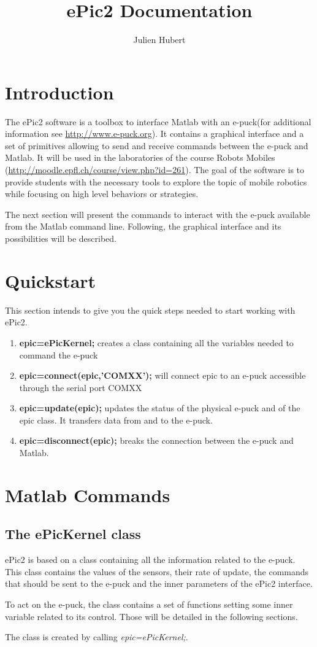 \documentclass[11pt,oneside,english,a4paper]{article}
\begin{document}
\title{ePic2 Documentation}
\author{Julien Hubert}
\maketitle
\section{Introduction}
The ePic2 software is a toolbox to interface Matlab with an e-puck(for additional information see \href{http://www.e-puck.org}{http://www.e-puck.org}). It contains a graphical interface and a set of primitives allowing to send and receive commands between the e-puck and Matlab. It will be used in the laboratories of the course Robots Mobiles (\href{http://moodle.epfl.ch/course/view.php?id=261}{http://moodle.epfl.ch/course/view.php?id=261}). The goal of the software is to provide students with the necessary tools to explore the topic of mobile robotics while focusing on high level behaviors or strategies.
\par The next section will present the commands to interact with the e-puck available from the Matlab command line. Following, the graphical interface and its possibilities will be described.

\section{Quickstart}
This section intends to give you the quick steps needed to start working with ePic2.
\begin{enumerate}
\item \textbf{epic=ePicKernel;} creates a class containing all the variables needed to command the e-puck
\item \textbf{epic=connect(epic,'COMXX');} will connect epic to an e-puck accessible through the serial port COMXX
\item \textbf{epic=update(epic);} updates the status of the physical e-puck and of the epic class. It transfers data from and to the e-puck. 
\item \textbf{epic=disconnect(epic);} breaks the connection between the e-puck and Matlab.

\end{enumerate}

\section{Matlab Commands}
\subsection{The ePicKernel class}
ePic2 is based on a class containing all the information related to the e-puck. This class contains the values of the sensors, their rate of update, the commands that should be sent to the e-puck and the inner parameters of the ePic2 interface.
\par To act on the e-puck, the class contains a set of functions setting some inner variable related to its control. Those will be detailed in the following sections.
\par The class is created by calling \emph{epic=ePicKernel;}.
\end{document}
